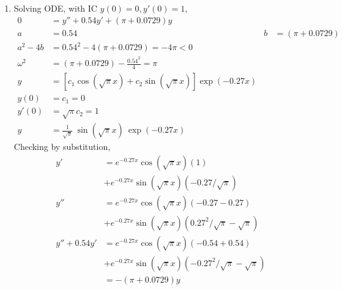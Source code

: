 \begin{enumerate}
    \item Solving ODE, with IC $ y(0) = 0, y'(0) = 1 $,
          \begin{align}
              0          & = y'' + 0.54y' + (\pi + 0.0729)y                                                          \\
              a          & = 0.54                                                             & b & = (\pi + 0.0729) \\
              a^{2} - 4b & = 0.54^{2} - 4(\pi + 0.0729) = -4\pi < 0                                                  \\
              \omega^{2} & = (\pi + 0.0729) - \frac{0.54^{2}}{4} = \pi                                               \\
              y          & = [c_{1}\cos(\sqrt{\pi} x) + c_{2}\sin(\sqrt{\pi} x)] \exp(-0.27x)                        \\
              y(0)       & = c_{1} = 0                                                                               \\
              y'(0)      & = \sqrt{\pi}c_{2} = 1                                                                     \\
              y          & = \frac{1}{\sqrt{\pi}}\ \sin(\sqrt{\pi} x)\  \exp(-0.27x)
          \end{align}
          Checking by substitution,
          \begin{align}
              y'           & = e^{-0.27x}\cos(\sqrt{\pi} x) (1)                                \\
                           & + e^{-0.27x}\sin(\sqrt{\pi} x)(- 0.27/\sqrt{\pi})                 \\
              y''          & = e^{-0.27x}\cos(\sqrt{\pi} x)(-0.27 - 0.27)                      \\
                           & + e^{-0.27x}\sin(\sqrt{\pi} x)(0.27^{2}/\sqrt{\pi} - \sqrt{\pi})  \\
              y'' + 0.54y' & = e^{-0.27x}\cos(\sqrt{\pi} x)(-0.54 + 0.54)                      \\
                           & + e^{-0.27x}\sin(\sqrt{\pi} x)(-0.27^{2}/\sqrt{\pi} - \sqrt{\pi}) \\
                           & = -(\pi + 0.0729) y
          \end{align}


\end{enumerate}
